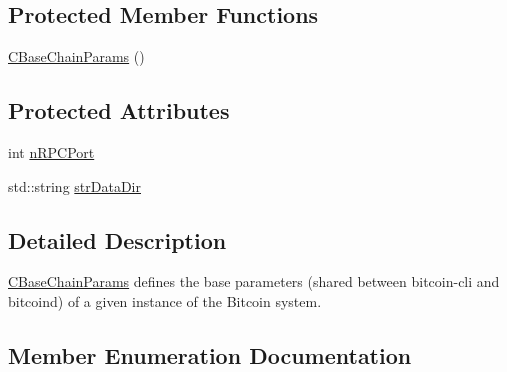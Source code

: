 \subsection*{Protected Member Functions}
\begin{DoxyCompactItemize}
\item 
\hyperlink{class_c_base_chain_params_a4c0e84608b2fa636be3a3683653d9533}{C\+Base\+Chain\+Params} ()
\end{DoxyCompactItemize}
\subsection*{Protected Attributes}
\begin{DoxyCompactItemize}
\item 
int \hyperlink{class_c_base_chain_params_ae020d8f669175bcac3ab44f9c095c977}{n\+R\+P\+C\+Port}
\item 
std\+::string \hyperlink{class_c_base_chain_params_af5868778f8c6c676aabc9fb2366d2447}{str\+Data\+Dir}
\end{DoxyCompactItemize}


\subsection{Detailed Description}
\hyperlink{class_c_base_chain_params}{C\+Base\+Chain\+Params} defines the base parameters (shared between bitcoin-\/cli and bitcoind) of a given instance of the Bitcoin system. 

\subsection{Member Enumeration Documentation}
\hypertarget{class_c_base_chain_params_a19fb46b499c21801c0ff3c8607a0994e}{}
